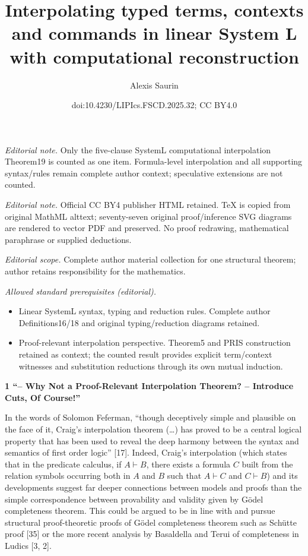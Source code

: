 \documentclass[10pt,a4paper]{article}
\title{Interpolating typed terms, contexts and commands in linear System L with computational reconstruction}
\author{Alexis Saurin}
\date{doi:10.4230/LIPIcs.FSCD.2025.32; CC BY4.0}
\begin{document}
\maketitle
\noindent\textit{Editorial note.} Only the five-clause SystemL computational interpolation Theorem19 is counted as one item. Formula-level interpolation and all supporting syntax/rules remain complete author context; speculative extensions are not counted.\par\medskip
\noindent\textit{Editorial note.} Official CC BY4 publisher HTML retained. TeX is copied from original MathML alttext; seventy-seven original proof/inference SVG diagrams are rendered to vector PDF and preserved. No proof redrawing, mathematical paraphrase or supplied deductions.\par\medskip
\noindent\textit{Editorial scope.} Complete author material collection for one structural theorem; author retains responsibility for the mathematics.\par\medskip
\noindent\textit{Allowed standard prerequisites (editorial).}\begin{itemize}
\item Linear SystemL syntax, typing and reduction rules. Complete author Definitions16/18 and original typing/reduction diagrams retained.
\item Proof-relevant interpolation perspective. Theorem5 and PRIS construction retained as context; the counted result provides explicit term/context witnesses and substitution reductions through its own mutual induction.
\end{itemize}\medskip

 
\par\medskip\noindent\textbf{1 “– Why Not a Proof-Relevant Interpolation Theorem?  – Introduce Cuts, Of Course!”}\par
 
 
In the words of Solomon Feferman, “though deceptively simple and plausible on the face of it, Craig’s interpolation theorem (…) has proved to be a central logical property that has been used to reveal the deep harmony between the syntax and semantics of first order logic” [17]. Indeed, Craig’s interpolation (which states that in the predicate calculus, if $A\vdash B$, there exists a formula $C$ built from the relation symbols occurring both in $A$ and $B$ such that $A\vdash C$ and $C\vdash B$) and its developments suggest far deeper connections between models and proofs than the simple correspondence between provability and validity given by Gödel completeness theorem. This could be argued to be in line with and pursue structural proof-theoretic proofs of Gödel completeness theorem such as Schütte proof [35] or the more recent analysis by Basaldella and Terui of completeness in Ludics [3, 2].\par
 
\end{document}
